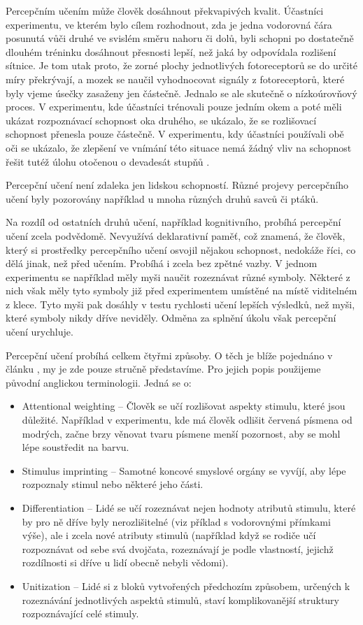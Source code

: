 Percepčním učením může člověk dosáhnout překvapivých kvalit. Účastníci
experimentu, ve kterém bylo cílem rozhodnout, zda je jedna vodorovná čára
posunutá vůči druhé ve svislém směru nahoru či dolů, byli schopni po dostatečně
dlouhém tréninku dosáhnout přesnosti lepší, než jaká by odpovídala rozlišení
sítnice. Je tom utak proto, že zorné plochy jednotlivých fotoreceptorů se do
určité míry překrývají, a mozek se naučil vyhodnocovat signály z fotoreceptorů,
které byly vjeme úsečky zasaženy jen částečně. Jednalo se ale skutečně o
nízkoúrovňový proces.  V experimentu, kde účastníci trénovali pouze jedním okem
a poté měli ukázat rozpoznávací schopnost oka druhého, se ukázalo, že se
rozlišovací schopnost přenesla pouze částečně. V experimentu, kdy účastníci
používali obě oči se ukázalo, že zlepšení ve vnímání této situace nemá žádný
vliv na schopnost řešit tutéž úlohu otočenou o devadesát stupňů \citep{uceni}.  

Percepční učení není zdaleka jen lidskou schopností. Různé projevy percepčního
učení byly pozorovány například u mnoha různých druhů savců či ptáků. 

Na rozdíl od ostatních druhů učení, například kognitivního, probíhá percepční
učení zcela podvědomě. Nevyužívá deklarativní paměť, což znamená, že člověk,
který si prostředky percepčního učení osvojil nějakou schopnost, nedokáže říci,
co dělá jinak, než před učením. Probíhá i zcela bez zpětné vazby. V jednom
experimentu se například měly myši naučit rozeznávat různé symboly. Některé z
nich však měly tyto symboly již před experimentem umístěné na místě viditelném
z klece. Tyto myši pak dosáhly v testu rychlosti učení lepších výsledků, než
myši, které symboly nikdy dříve neviděly. Odměna za splnění úkolu však
percepční učení urychluje.

Percepční učení probíhá celkem čtyřmi způsoby. O těch je blíže pojednáno
v článku \citep{uceni}, my je zde pouze stručně představíme. Pro jejich popis použijeme původní anglickou terminologii. Jedná se o:

\begin{itemize}
\item Attentional weighting -- Člověk se učí rozlišovat aspekty stimulu,
které jsou důležité. Například v experimentu, kde má člověk odlišit červená
písmena od modrých, začne brzy věnovat tvaru písmene menší pozornost, aby se
mohl lépe soustředit na barvu.
\item Stimulus imprinting -- Samotné koncové smyslové orgány se vyvíjí, aby
lépe rozpoznaly stimul nebo některé jeho části.
\item Differentiation -- Lidé se učí rozeznávat nejen hodnoty atributů stimulu,
které by pro ně dříve byly nerozlišitelné (viz příklad s vodorovnými přímkami výše), ale i zcela nové atributy stimulů (například když se rodiče učí rozpoznávat od sebe svá dvojčata, rozeznávají je podle vlastností, jejichž rozdílnosti si dříve u lidí obecně nebyli vědomi).
\item Unitization -- Lidé si z bloků vytvořených předchozím způsobem, určených k rozeznávání jednotlivých aspektů stimulů, staví komplikovanější struktury rozpoznávající celé stimuly. 
\end{itemize}

